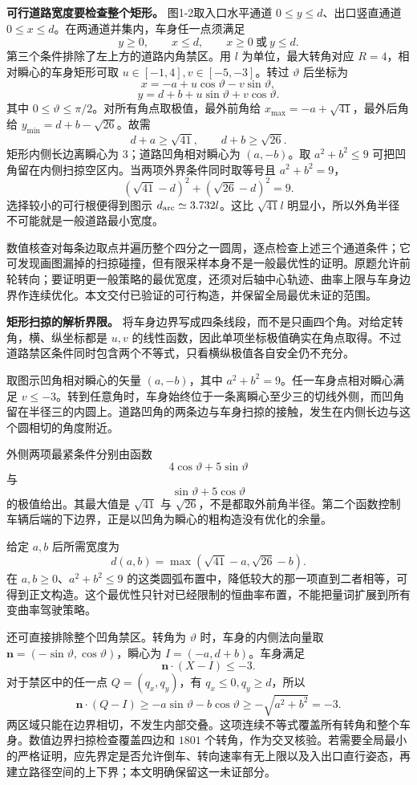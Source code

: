 \documentclass[12pt,a4paper,UTF8]{ctexart}
\begin{document}
\textbf{可行道路宽度要检查整个矩形。} 图1-2取入口水平通道
\(0\le y\le d\)、出口竖直通道
\(0\le x\le d\)。在两通道并集内，车身任一点须满足 \[
y\ge0,\qquad x\le d,\qquad x\ge0\ \text{或}\ y\le d.
\] 第三个条件排除了左上方的道路内角禁区。用 \(l\) 为单位，最大转角对应
\(R=4\)，相对瞬心的车身矩形可取 \(u\in[-1,4],v\in[-5,-3]\)。转过
\(\vartheta\) 后坐标为 \[
x=-a+u\cos\vartheta-v\sin\vartheta,
\] \[
y=d+b+u\sin\vartheta+v\cos\vartheta.
\] 其中 \(0\le\vartheta\le\pi/2\)。对所有角点取极值，最外前角给
\(x_{\max}=-a+\sqrt{41}\)，最外后角给 \(y_{\min}=d+b-\sqrt{26}\)。故需
\[
d+a\ge\sqrt{41},\qquad d+b\ge\sqrt{26}.
\] 矩形内侧长边离瞬心为 \(3\)；道路凹角相对瞬心为 \((a,-b)\)。取
\(a^2+b^2\le9\) 可把凹角留在内侧扫掠空区内。当两项外界条件同时取等号且
\(a^2+b^2=9\)， \[
(\sqrt{41}-d)^2+(\sqrt{26}-d)^2=9.
\] 选择较小的可行根便得到图示 \(d_{\rm arc}\simeq3.732l\)。这比
\(\sqrt{41}l\) 明显小，所以外角半径不可能就是一般道路最小宽度。

数值核查对每条边取点并遍历整个四分之一圆周，逐点检查上述三个通道条件；它可发现画图漏掉的扫掠碰撞，但有限采样本身不是一般最优性的证明。原题允许前轮转向；要证明更一般策略的最优宽度，还须对后轴中心轨迹、曲率上限与车身边界作连续优化。本文交付已验证的可行构造，并保留全局最优未证的范围。

\textbf{矩形扫掠的解析界限。}
将车身边界写成四条线段，而不是只画四个角。对给定转角，横、纵坐标都是
\(u,v\)
的线性函数，因此单项坐标极值确实在角点取得。不过道路禁区条件同时包含两个不等式，只看横纵极值各自安全仍不充分。

取图示凹角相对瞬心的矢量 \((a,-b)\)，其中
\(a^2+b^2=9\)。任一车身点相对瞬心满足
\(v\le-3\)。转到任意角时，车身始终位于一条离瞬心至少三的切线外侧，而凹角留在半径三的内圆上。道路凹角的两条边与车身扫掠的接触，发生在内侧长边与这个圆相切的角度附近。

外侧两项最紧条件分别由函数 \[
4\cos\vartheta+5\sin\vartheta
\] 与 \[
\sin\vartheta+5\cos\vartheta
\] 的极值给出。其最大值是 \(\sqrt{41}\) 与
\(\sqrt{26}\)，不是都取外前角半径。第二个函数控制车辆后端的下边界，正是以凹角为瞬心的粗构造没有优化的余量。

给定 \(a,b\) 后所需宽度为 \[
d(a,b)=\max(\sqrt{41}-a,\sqrt{26}-b).
\] 在 \(a,b\ge0\)、\(a^2+b^2\le9\)
的这类圆弧布置中，降低较大的那一项直到二者相等，可得到正文构造。这个最优性只针对已经限制的恒曲率布置，不能把量词扩展到所有变曲率驾驶策略。

还可直接排除整个凹角禁区。转角为 \(\vartheta\) 时，车身的内侧法向量取
\(\bm n=(-\sin\vartheta,\cos\vartheta)\)，瞬心为
\(I=(-a,d+b)\)。车身满足 \[
\bm n\cdot(X-I)\le-3.
\] 对于禁区中的任一点 \(Q=(q_x,q_y)\)，有 \(q_x\le0,q_y\ge d\)，所以 \[
\bm n\cdot(Q-I)\ge-a\sin\vartheta-b\cos\vartheta\ge-\sqrt{a^2+b^2}=-3.
\]
两区域只能在边界相切，不发生内部交叠。这项连续不等式覆盖所有转角和整个车身。数值边界扫掠检查覆盖四边和
\(1801\)
个转角，作为交叉核验。若需要全局最小的严格证明，应先界定是否允许倒车、转向速率有无上限以及入出口直行姿态，再建立路径空间的上下界；本文明确保留这一未证部分。
\end{document}
